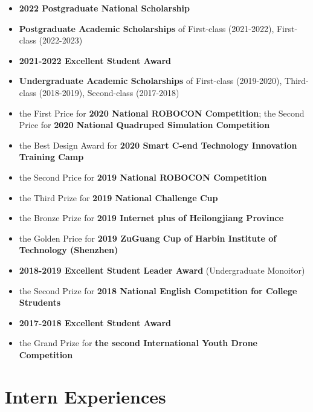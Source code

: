 \documentclass[11pt,a4paper,sans]{moderncv}        %
\begin{document}
\begin{itemize}

    \item {\textbf{2022 Postgraduate National Scholarship}}

\item{\textbf{Postgraduate Academic Scholarships} of First-class (2021-2022), First-class (2022-2023)}
\item {\textbf{2021-2022 Excellent Student Award}}
\item{\textbf{Undergraduate Academic Scholarships} of First-class (2019-2020), Third-class (2018-2019), Second-class (2017-2018)}

\item{the First Price for \textbf{2020 National ROBOCON Competition}; the Second Price for \textbf{2020 National Quadruped Simulation Competition}}

\item {the Best Design Award for \textbf{2020 Smart C-end Technology Innovation Training Camp}}

\item{the Second Price for \textbf{2019 National ROBOCON Competition}}

\item{the Third Prize for \textbf{2019 National Challenge Cup}}

\item{the Bronze Prize for \textbf{2019 Internet plus of Heilongjiang Province}}
\item{the Golden Price for \textbf{2019 ZuGuang Cup of Harbin Institute of Technology (Shenzhen)}}

\item {\textbf{2018-2019 Excellent Student Leader Award} (Undergraduate Monoitor)}

\item{the Second Prize for \textbf{2018 National English Competition for College Strudents}}
\item {\textbf{2017-2018 Excellent Student Award}}

\item{the Grand Prize for \textbf{the second International Youth Drone Competition}}

\end{itemize}

\section{Intern Experiences}
\end{document}
